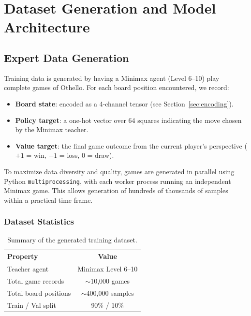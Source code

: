 \section{Dataset Generation and Model Architecture}

\subsection{Expert Data Generation}

Training data is generated by having a Minimax agent (Level 6--10) play complete games of Othello. For each board position encountered, we record:
\begin{itemize}
    \item \textbf{Board state}: encoded as a 4-channel tensor (see Section~\ref{sec:encoding}).
    \item \textbf{Policy target}: a one-hot vector over 64 squares indicating the move chosen by the Minimax teacher.
    \item \textbf{Value target}: the final game outcome from the current player's perspective ($+1$ = win, $-1$ = loss, $0$ = draw).
\end{itemize}

To maximize data diversity and quality, games are generated in parallel using Python \texttt{multiprocessing}, with each worker process running an independent Minimax game. This allows generation of hundreds of thousands of samples within a practical time frame.

\subsubsection{Dataset Statistics}

\begin{table}[H]
    \centering
    \caption{Summary of the generated training dataset.}
    \label{tab:dataset}
    \begin{tabular}{lc}
        \toprule
        \textbf{Property} & \textbf{Value} \\
        \midrule
        Teacher agent & Minimax Level 6--10 \\
        Total game records & $\sim$10{,}000 games \\
        Total board positions & $\sim$400{,}000 samples \\
        Train / Val split & 90\% / 10\% \\
        \bottomrule
    \end{tabular}
\end{table}

